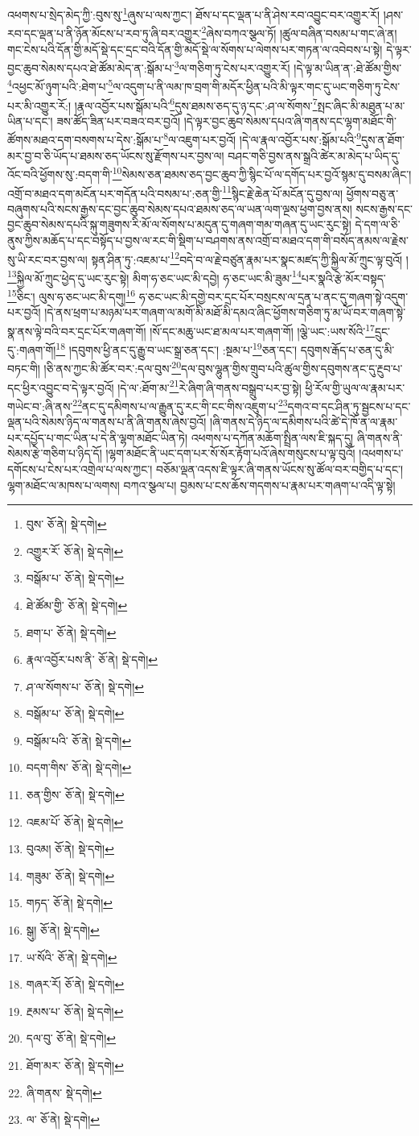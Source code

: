 འཕགས་པ་སྲེད་མེད་ཀྱི་:བུས་སུ་\footnote{བུས་  ཅོ་ནེ།  སྡེ་དགེ། }ཞུས་པ་ལས་ཀྱང་། ཐོས་པ་དང་ལྡན་པ་ནི་ཤེས་རབ་འབྱུང་བར་འགྱུར་རོ། །ཤས་རབ་དང་ལྡན་པ་ནི་ཉོན་མོངས་པ་རབ་ཏུ་ཞི་བར་འགྱུར་\footnote{འགྱུར་རོ་  ཅོ་ནེ།  སྡེ་དགེ། }ཞེས་བཀའ་སྩལ་ཏོ། །ཚུལ་བཞིན་བསམ་པ་གང་ཞེ་ན། གང་ངེས་པའི་དོན་གྱི་མདོ་སྡེ་དང་དྲང་བའི་དོན་གྱི་མདོ་སྡེ་ལ་སོགས་པ་ལེགས་པར་གཏན་ལ་འབེབས་པ་སྟེ། དེ་ལྟར་བྱང་ཆུབ་སེམས་དཔའ་ཐེ་ཚོམ་མེད་ན་:སྒོམ་པ་\footnote{བསྒོམ་པ་  ཅོ་ནེ།  སྡེ་དགེ། }ལ་གཅིག་ཏུ་ངེས་པར་འགྱུར་རོ། །དེ་ལྟ་མ་ཡིན་ན་:ཐེ་ཚོམ་གྱིས་\footnote{ཐེ་ཚོམ་གྱི་  ཅོ་ནེ།  སྡེ་དགེ། }འཕྱང་མོ་ཉུག་པའི་:ཐེག་པ་\footnote{ཐག་པ་  ཅོ་ནེ།  སྡེ་དགེ། }ལ་འདུག་པ་ནི་ལམ་ཁ་བྲག་གི་མདོར་ཕྱིན་པའི་མི་ལྟར་གང་དུ་ཡང་གཅིག་ཏུ་ངེས་པར་མི་འགྱུར་རོ:། །རྣལ་འབྱོར་པས་སྒོམ་པའི་\footnote{རྣལ་འབྱོར་པས་ནི་  ཅོ་ནེ།  སྡེ་དགེ། }དུས་ཐམས་ཅད་དུ་ཉ་དང་:ཤ་ལ་སོགས་\footnote{ཤ་ལ་སོགས་པ་  ཅོ་ནེ།  སྡེ་དགེ། }སྤང་ཞིང་མི་མཐུན་པ་མ་ཡིན་པ་དང་། ཟས་ཚོད་ཟིན་པར་བཟའ་བར་བྱའོ། །དེ་ལྟར་བྱང་ཆུབ་སེམས་དཔའ་ཞི་གནས་དང་ལྷག་མཐོང་གི་ཚོགས་མཐའ་དག་བསགས་པ་དེས་:སྒོམ་པ་\footnote{བསྒོམ་པ་  ཅོ་ནེ།  སྡེ་དགེ། }ལ་འཇུག་པར་བྱའོ། །དེ་ལ་རྣལ་འབྱོར་པས་:སྒོམ་པའི་\footnote{བསྒོམ་པའི་  ཅོ་ནེ།  སྡེ་དགེ། }དུས་ན་ཐོག་མར་བྱ་བ་ཅི་ཡོད་པ་ཐམས་ཅད་ཡོངས་སུ་རྫོགས་པར་བྱས་ལ། བཤང་གཅི་བྱས་ནས་སྒྲའི་ཚེར་མ་མེད་པ་ཡིད་དུ་འོང་བའི་ཕྱོགས་སུ་:བདག་གི་\footnote{བདག་གིས་  ཅོ་ནེ།  སྡེ་དགེ། }སེམས་ཅན་ཐམས་ཅད་བྱང་ཆུབ་ཀྱི་སྙིང་པོ་ལ་དགོད་པར་བྱའོ་སྙམ་དུ་བསམ་ཞིང་། འགྲོ་བ་མཐའ་དག་མངོན་པར་གདོན་པའི་བསམ་པ་:ཅན་གྱི་\footnote{ཅན་གྱིས་  ཅོ་ནེ།  སྡེ་དགེ། }སྙིང་རྗེ་ཆེན་པོ་མངོན་དུ་བྱས་ལ། ཕྱོགས་བཅུ་ན་བཞུགས་པའི་སངས་རྒྱས་དང་བྱང་ཆུབ་སེམས་དཔའ་ཐམས་ཅད་ལ་ཡན་ལག་ལྔས་ཕྱག་བྱས་ནས། སངས་རྒྱས་དང་བྱང་ཆུབ་སེམས་དཔའི་སྐུ་གཟུགས་རི་མོ་ལ་སོགས་པ་མདུན་དུ་གཞག་གམ་གཞན་དུ་ཡང་རུང་སྟེ། དེ་དག་ལ་ཅི་ནུས་ཀྱིས་མཆོད་པ་དང་བསྟོད་པ་བྱས་ལ་རང་གི་སྡིག་པ་བཤགས་ནས་འགྲོ་བ་མཐའ་དག་གི་བསོད་ནམས་ལ་རྗེས་སུ་ཡི་རང་བར་བྱས་ལ། སྟན་ཤིན་ཏུ་:འཇམ་པ་\footnote{འཇམ་པོ་  ཅོ་ནེ།  སྡེ་དགེ། }བདེ་བ་ལ་རྗེ་བཙུན་རྣམ་པར་སྣང་མཛད་ཀྱི་སྐྱིལ་མོ་ཀྲུང་ལྟ་བུའོ། ། \footnote{བུའམ།   ཅོ་ནེ།  སྡེ་དགེ། }སྐྱིལ་མོ་ཀྲུང་ཕྱེད་དུ་ཡང་རུང་སྟེ། མིག་ཧ་ཅང་ཡང་མི་དབྱེ། ཧ་ཅང་ཡང་མི་ཟུམ་\footnote{གཟུམ་  ཅོ་ནེ།  སྡེ་དགེ། }པར་སྣའི་རྩེ་མོར་བསྟད་\footnote{གཏད་  ཅོ་ནེ།  སྡེ་དགེ། }ཅིང་། ལུས་ཧ་ཅང་ཡང་མི་དགུ།\footnote{སྒུ།  ཅོ་ནེ།  སྡེ་དགེ། } ཧ་ཅང་ཡང་མི་དགྱེ་བར་དྲང་པོར་བསྲངས་ལ་དྲན་པ་ནང་དུ་གཞག་སྟེ་འདུག་པར་བྱའོ། །དེ་ནས་ཕྲག་པ་མཉམ་པར་གཞག་ལ་མགོ་མི་མཐོ་མི་དམའ་ཞིང་ཕྱོགས་གཅིག་ཏུ་མ་ཡོ་བར་གཞག་སྟེ་སྣ་ནས་ལྟེ་བའི་བར་དྲང་པོར་གཞག་གོ། །སོ་དང་མཆུ་ཡང་ཐ་མལ་པར་གཞག་གོ། །ལྕེ་ཡང་:ཡས་སོའི་\footnote{ཡ་སོའི་  ཅོ་ནེ།  སྡེ་དགེ། }དྲུང་དུ་:གཞག་གོ།\footnote{གཞར་རོ།  ཅོ་ནེ།  སྡེ་དགེ། } །དབུགས་ཕྱི་ནང་དུ་རྒྱུ་བ་ཡང་སྒྲ་ཅན་དང་། :སྔམ་པ་\footnote{རྔམས་པ་  ཅོ་ནེ།  སྡེ་དགེ། }ཅན་དང་། དབུགས་རྒོད་པ་ཅན་དུ་མི་བཏང་གི། །ཅི་ནས་ཀྱང་མི་ཚོར་བར་:དལ་བུས་\footnote{དལ་བུ་  ཅོ་ནེ།  སྡེ་དགེ། }དལ་བུས་ལྷུན་གྱིས་གྲུབ་པའི་ཚུལ་གྱིས་དབུགས་ནང་དུ་རྔུབ་པ་དང་ཕྱིར་འབྱུང་བ་དེ་ལྟར་བྱའོ། །དེ་ལ་:ཐོག་མ་\footnote{ཐོག་མར་  ཅོ་ནེ།  སྡེ་དགེ། }རེ་ཞིག་ཞི་གནས་བསྒྲུབ་པར་བྱ་སྟེ། ཕྱི་རོལ་གྱི་ཡུལ་ལ་རྣམ་པར་གཡེང་བ་:ཞི་ནས་\footnote{ཞི་གནས་  སྡེ་དགེ། }ནང་དུ་དམིགས་པ་ལ་རྒྱུན་དུ་རང་གི་ངང་གིས་འཇུག་པ་\footnote{ལ་  ཅོ་ནེ།  སྡེ་དགེ། }དགའ་བ་དང་ཤིན་ཏུ་སྦྱངས་པ་དང་ལྡན་པའི་སེམས་ཉིད་ལ་གནས་པ་ནི་ཞི་གནས་ཞེས་བྱའོ། །ཞི་གནས་དེ་ཉིད་ལ་དམིགས་པའི་ཚེ་དེ་ཁོ་ན་ལ་རྣམ་པར་དཔྱོད་པ་གང་ཡིན་པ་དེ་ནི་ལྷག་མཐོང་ཡིན་ཏེ། འཕགས་པ་དཀོན་མཆོག་སྤྲིན་ལས་ཇི་སྐད་དུ། ཞི་གནས་ནི་སེམས་རྩེ་གཅིག་པ་ཉིད་དོ། །ལྷག་མཐོང་ནི་ཡང་དག་པར་སོ་སོར་རྟོག་པའོ་ཞེས་གསུངས་པ་ལྟ་བུའོ། །འཕགས་པ་དགོངས་པ་ངེས་པར་འགྲེལ་པ་ལས་ཀྱང་། བཅོམ་ལྡན་འདས་ཇི་ལྟར་ཞི་གནས་ཡོངས་སུ་ཚོལ་བར་བགྱིད་པ་དང་། ལྷག་མཐོང་ལ་མཁས་པ་ལགས། བཀའ་སྩལ་པ། བྱམས་པ་ངས་ཆོས་གདགས་པ་རྣམ་པར་གཞག་པ་འདི་ལྟ་སྟེ། 